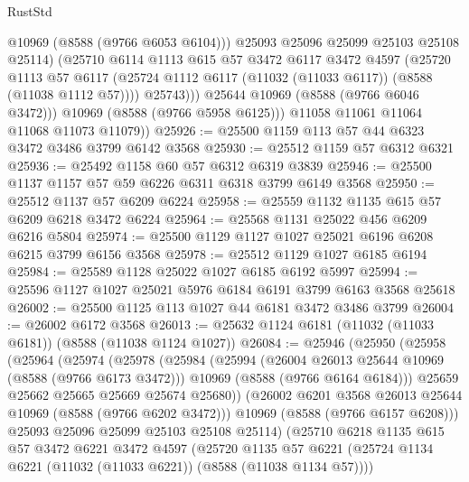 \begin{lexlean}{RustStd}
\begin{coremodule}
                    @10969
                    (@8588 (@9766 @6053 @6104)))
                  @25093
                  @25096
                  @25099
                  @25103
                  @25108
                  @25114)
                (@25710
                  @6114
                  @1113
                  @615
                  @57
                  @3472
                  @6117
                  @3472
                  @4597
                  (@25720
                    @1113
                    @57
                    @6117
                    (@25724 @1112 @6117 (@11032 (@11033 @6117)) (@8588 (@11038 @1112 @57))))
                  @25743)))
            @25644
            @10969
            (@8588 (@9766 @6046 @3472)))
          @10969
          (@8588 (@9766 @5958 @6125)))
        @11058
        @11061
        @11064
        @11068
        @11073
        @11079))
@25926 := @25500 @1159 @113 @57 @44 @6323 @3472 @3486 @3799 @6142 @3568
@25930 := @25512 @1159 @57 @6312 @6321
@25936 := @25492 @1158 @60 @57 @6312 @6319 @3839
@25946 := @25500 @1137 @1157 @57 @59 @6226 @6311 @6318 @3799 @6149 @3568
@25950 := @25512 @1137 @57 @6209 @6224
@25958 := @25559 @1132 @1135 @615 @57 @6209 @6218 @3472 @6224
@25964 := @25568 @1131 @25022 @456 @6209 @6216 @5804
@25974 := @25500 @1129 @1127 @1027 @25021 @6196 @6208 @6215 @3799 @6156 @3568
@25978 := @25512 @1129 @1027 @6185 @6194
@25984 := @25589 @1128 @25022 @1027 @6185 @6192 @5997
@25994 := @25596 @1127 @1027 @25021 @5976 @6184 @6191 @3799 @6163 @3568 @25618
@26002 := @25500 @1125 @113 @1027 @44 @6181 @3472 @3486 @3799
@26004 := @26002 @6172 @3568
@26013 := @25632 @1124 @6181 (@11032 (@11033 @6181)) (@8588 (@11038 @1124 @1027))
@26084 := @25946
    (@25950
      (@25958
        (@25964
          (@25974
            (@25978
              (@25984
                (@25994
                  (@26004 @26013 @25644 @10969 (@8588 (@9766 @6173 @3472)))
                  @10969
                  (@8588 (@9766 @6164 @6184)))
                @25659
                @25662
                @25665
                @25669
                @25674
                @25680))
            (@26002 @6201 @3568 @26013 @25644 @10969 (@8588 (@9766 @6202 @3472)))
            @10969
            (@8588 (@9766 @6157 @6208)))
          @25093
          @25096
          @25099
          @25103
          @25108
          @25114)
        (@25710
          @6218
          @1135
          @615
          @57
          @3472
          @6221
          @3472
          @4597
          (@25720
            @1135
            @57
            @6221
            (@25724 @1134 @6221 (@11032 (@11033 @6221)) (@8588 (@11038 @1134 @57))))

\end{coremodule}
\end{lexlean}

